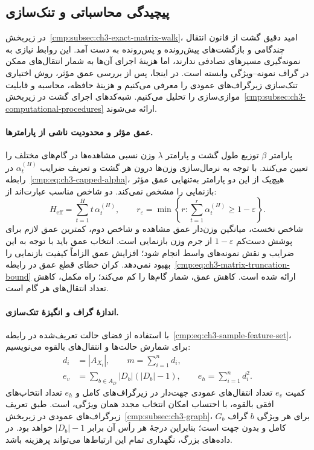 \subsection{پیچیدگی محاسباتی و تنک‌سازی}
\label{cmp:subsec:ch3-computational-methods}
در زیربخش~\ref{cmp:subsec:ch3-exact-matrix-walk}، امید دقیق
گشت از قانون انتقال چندگامی و بازگشت‌های
پیش‌رونده و پس‌رونده به دست آمد. این روابط
نیازی به نمونه‌گیری مسیرهای تصادفی ندارند،
اما هزینهٔ اجرای آن‌ها به شمار انتقال‌های
ممکن در گراف نمونه--ویژگی وابسته است.
در اینجا، پس از بررسی عمق مؤثر، روش
اختیاری تنک‌سازی زیرگراف‌های عمودی را
معرفی می‌کنیم و هزینهٔ حافظه، محاسبه و
قابلیت موازی‌سازی را تحلیل می‌کنیم.
شبه‌کدهای اجرای گشت در زیربخش~\ref{cmp:subsec:ch3-computational-procedures} ارائه می‌شوند.

\paragraph{عمق مؤثر و محدودیت ناشی از پارامترها.}
پارامتر $\beta$ توزیع طول گشت و پارامتر
$\lambda$ وزن نسبی مشاهده‌ها در گام‌های
مختلف را تعیین می‌کنند. با توجه به
نرمال‌سازی وزن‌ها درون هر گشت و تعریف
ضرایب $\alpha_t^{(H)}$ در
رابطه~\eqref{cmp:eq:ch3-capped-alpha}،
هیچ‌یک از این دو پارامتر به‌تنهایی
عمق مؤثر بازنمایی را مشخص نمی‌کند.
دو شاخص مناسب عبارت‌اند از:
\begin{equation}\label{cmp:eq:ch3-effective-depth}
\boxed{
H_{\mathrm{eff}}=\sum_{t=1}^{H}t\,\alpha_t^{(H)},
\qquad
r_\varepsilon=\min\left\{r:
\sum_{t=1}^{r}\alpha_t^{(H)}
\ge1-\varepsilon\right\}.
}
\end{equation}
شاخص نخست، میانگین وزن‌دار عمق مشاهده
و شاخص دوم، کمترین عمق لازم برای پوشش
دست‌کم $1-\varepsilon$ از جرم وزن
بازنمایی است. انتخاب عمق باید با توجه
به این ضرایب و نقش نمونه‌های واسط
انجام شود؛ افزایش عمق الزاماً کیفیت
بازنمایی را بهبود نمی‌دهد. کران خطای
قطع عمق در
رابطه~\eqref{cmp:eq:ch3-matrix-truncation-bound}
ارائه شده است. کاهش عمق، شمار گام‌ها
را کم می‌کند؛ راه مکمل، کاهش تعداد
انتقال‌های هر گام است.

\paragraph{اندازهٔ گراف و انگیزهٔ تنک‌سازی.}
با استفاده از فضای حالت تعریف‌شده در
رابطه~\eqref{cmp:eq:ch3-sample-feature-set}،
برای شمارش حالت‌ها و انتقال‌های بالقوه
می‌نویسیم:
\begin{equation}\label{cmp:eq:ch3-graph-size}
\boxed{
\begin{aligned}
d_i&=|A_{X_i}|,\qquad
m=\sum_{i=1}^{n}d_i,\\
e_v&=\sum_{b\in A_D}|D_b|(|D_b|-1),
\qquad
e_h=\sum_{i=1}^{n}d_i^2.
\end{aligned}
}
\end{equation}
کمیت $e_v$ تعداد انتقال‌های عمودی
جهت‌دار در زیرگراف‌های کامل و $e_h$
تعداد انتخاب‌های افقی بالقوه، با احتساب
امکان انتخاب مجدد همان ویژگی، است.
طبق تعریف زیرگراف‌های عمودی در
زیربخش~\ref{cmp:subsec:ch3-graph}،
برای هر ویژگی $b$ گراف $G_b$ کامل و
بدون جهت است؛ بنابراین درجهٔ هر رأس
آن برابر $|D_b|-1$ خواهد بود. در داده‌های
بزرگ، نگهداری تمام این ارتباط‌ها
می‌تواند پرهزینه باشد.


